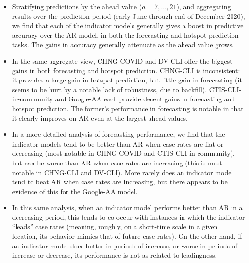 \documentclass[9pt,twocolumn,twoside,lineno]{pnas-new}
\begin{document}
\begin{itemize}
\item Stratifying predictions by the ahead value ($a=7,\ldots,21$), and
  aggregating results over the prediction period (early June through end of
  December 2020), we find that each of the indicator models generally gives a
  boost in predictive accuracy over the AR model, in both the forecasting and
  hotspot prediction tasks.  The gains in accuracy generally attenuate as the
  ahead value grows. 

\item In the same aggregate view, CHNG-COVID and DV-CLI offer the biggest 
  gains in both forecasting and hotspot prediction.  CHNG-CLI is
  inconsistent: it provides a large gain in hotspot prediction, but little gain  
  in forecasting (it seems to be hurt by a notable lack of robustness, due
  to backfill).  CTIS-CLI-in-community and Google-AA each provide decent 
  gains in forecasting and hotspot prediction.  The former's performance in 
  forecasting is notable in that it clearly improves on AR even at the largest
  ahead values.   

\item In a more detailed analysis of forecasting performance, we find that the
  indicator models tend to be better than AR when case rates are flat or
  decreasing (most notable in CHNG-COVID and CTIS-CLI-in-community), but can be
  worse than AR when case rates are increasing (this is most notable in CHNG-CLI
  and DV-CLI). More rarely does an indicator model tend to beat AR when case
  rates are increasing, but there appears to be evidence of this for the
  Google-AA model.   

\item In this same analysis, when an indicator model performs better than AR 
  in a decreasing period, this tends to co-occur with instances in which the 
  indicator ``leads'' case rates (meaning, roughly, on a short-time scale in a
  given location, its behavior mimics that of future case rates).  On
  the other hand, if an indicator model does better in periods of
  increase, or worse in periods of increase or decrease, its performance is
  not as related to leadingness.   
\end{itemize}
\end{document}
